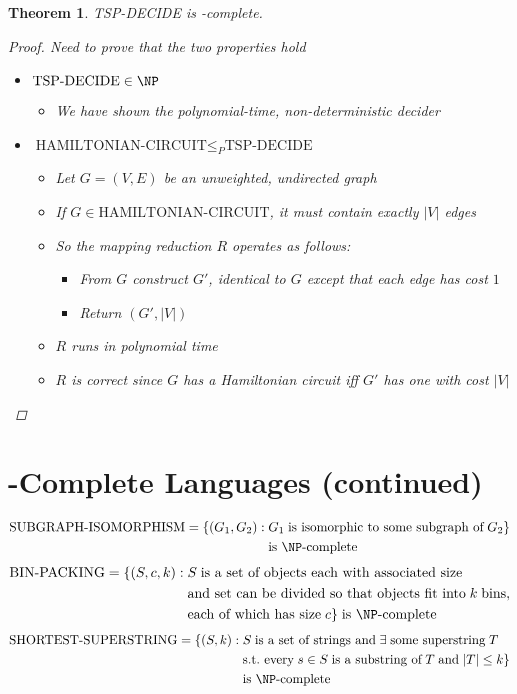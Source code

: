 \documentclass[a4paper]{report}
\newtheorem{theo}{Theorem}
\newcommand{\bookref}[3]{\marginpar{\faBook{}~#1\\Chapter #2\\Section #3}}
\theoremstyle{definition}
\begin{document}
\begin{theo}
TSP-DECIDE is \NP-complete.
\begin{proof}
Need to prove that the two properties hold
\begin{itemize}
\item {} $\text{TSP-DECIDE} \in \NP$
\begin{itemize}
\item We have shown the polynomial-time, non-deterministic decider 
\end{itemize}
\item {} $\text{HAMILTONIAN-CIRCUIT} \leq_P \text{TSP-DECIDE}$
\begin{itemize}
\item Let $G = (V, E)$ be an unweighted, undirected graph
\item If $G \in \text{HAMILTONIAN-CIRCUIT}$, it must contain exactly $|V|$ edges
\item So the mapping reduction $R$ operates as follows:
\begin{itemize}
\item From $G$ construct $G'$, identical to $G$ except that each edge has cost $1$
\item Return $(G', |V|)$
\end{itemize}
\item $R$ runs in polynomial time
\item $R$ is correct since $G$ has a Hamiltonian circuit iff $G'$ has one with cost $|V|$
\end{itemize}
\end{itemize}
\end{proof}
\end{theo}

\section{\NP-Complete Languages (continued)}
\bookref{ER}{28}{28.6.1}
\vspace{-0.3cm}%
\begin{align*}
\text{SUBGRAPH-ISOMORPHISM} = \{ (G_1, G_2) :& \; G_1 \;\text{is isomorphic to some subgraph of} \; G_2\}\\ & \;\text{is \NP-complete}
\end{align*}
%
\begin{align*}
\text{BIN-PACKING} = \{ (S, c, k) : &\; S \;\text{is a set of objects each with associated size}\\ & \;\text{and set can be divided so that objects fit into} \;k \; \text{bins},\\ &\;\text{each of which has size} \; c\} \;\text{is \NP-complete}
\end{align*}
%
\begin{align*}
\text{SHORTEST-SUPERSTRING} = \{ (S, k) : & \;S \;\text{is a set of strings and} \; \exists \;\text{some superstring} \; T \\ & \;\text{s.t.~every} \;s \in S \;\text{is a substring of} \; T \; \text{and} \; |T| \leq k\}\\ & \;\text{is \NP-complete}
\end{align*}
\end{document}
